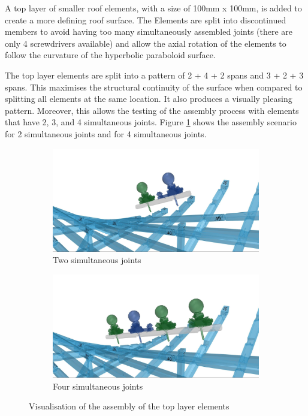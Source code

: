 A top layer of smaller roof elements, with a size of 100mm x 100mm, is added to create a more defining roof surface. The Elements are split into discontinued members to avoid having too many simultaneously assembled joints (there are only 4 screwdrivers available) and allow the axial rotation of the elements to follow the curvature of the hyperbolic paraboloid surface. 

The top layer elements are split into a pattern of 2 + 4 + 2 spans and 3 + 2 + 3 spans. This maximises the structural continuity of the surface when compared to splitting all elements at the same location. It also produces a visually pleasing pattern. Moreover, this allows the testing of the assembly process with elements that have 2, 3, and 4 simultaneous joints. Figure \ref{fig:top-layer-elements-assembly-visualisation} shows the assembly scenario for 2 simultaneous joints and for 4 simultaneous joints.

\begin{figure}[!h]
    \centering
    \begin{subfigure}[b]{0.49\textwidth}
        \centering
        \includegraphics[width=\textwidth]{images/7b/img03.jpg}
        \caption{Two simultaneous joints}
    \end{subfigure}
    \hfill
    \begin{subfigure}[b]{0.49\textwidth}
        \centering
        \includegraphics[width=\textwidth]{images/7b/img04.jpg}
        \caption{Four simultaneous joints}
    \end{subfigure}
    \caption{Visualisation of the assembly of the top layer elements}
    \label{fig:top-layer-elements-assembly-visualisation}
\end{figure}

